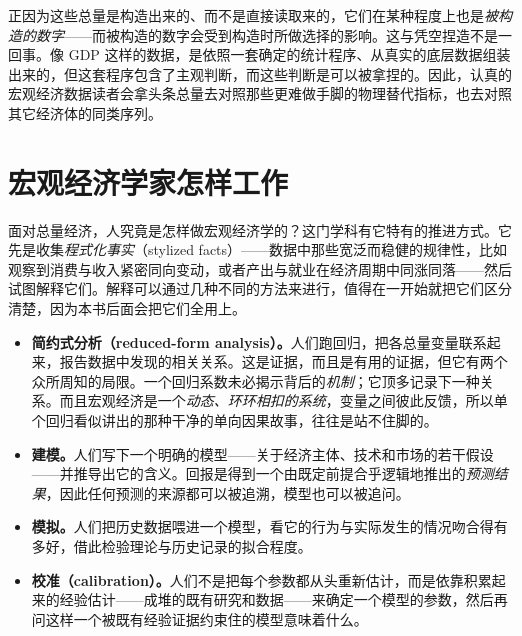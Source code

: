 正因为这些总量是构造出来的、而不是直接读取来的，它们在某种程度上也是\emph{被构造的数字}——而被构造的数字会受到构造时所做选择的影响。这与凭空捏造不是一回事。像 GDP 这样的数据，是依照一套确定的统计程序、从真实的底层数据组装出来的，但这套程序包含了主观判断，而这些判断是可以被拿捏的。因此，认真的宏观经济数据读者会拿头条总量去对照那些更难做手脚的物理替代指标，也去对照其它经济体的同类序列。


\section{宏观经济学家怎样工作}

面对总量经济，人究竟是怎样做宏观经济学的？这门学科有它特有的推进方式。它先是收集\emph{程式化事实}（stylized facts）——数据中那些宽泛而稳健的规律性，比如观察到消费与收入紧密同向变动，或者产出与就业在经济周期中同涨同落——然后试图解释它们。解释可以通过几种不同的方法来进行，值得在一开始就把它们区分清楚，因为本书后面会把它们全用上。

\begin{itemize}
    \item \textbf{简约式分析（reduced-form analysis）。}人们跑回归，把各总量变量联系起来，报告数据中发现的相关关系。这是证据，而且是有用的证据，但它有两个众所周知的局限。一个回归系数未必揭示背后的\emph{机制}；它顶多记录下一种关系。而且宏观经济是一个\emph{动态、环环相扣的系统}，变量之间彼此反馈，所以单个回归看似讲出的那种干净的单向因果故事，往往是站不住脚的。
    \item \textbf{建模。}人们写下一个明确的模型——关于经济主体、技术和市场的若干假设——并推导出它的含义。回报是得到一个由既定前提合乎逻辑地推出的\emph{预测结果}，因此任何预测的来源都可以被追溯，模型也可以被追问。
    \item \textbf{模拟。}人们把历史数据喂进一个模型，看它的行为与实际发生的情况吻合得有多好，借此检验理论与历史记录的拟合程度。
    \item \textbf{校准（calibration）。}人们不是把每个参数都从头重新估计，而是依靠积累起来的经验估计——成堆的既有研究和数据——来确定一个模型的参数，然后再问这样一个被既有经验证据约束住的模型意味着什么。
\end{itemize}

